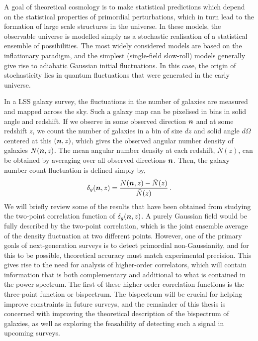 A goal of theoretical cosmology is to make statistical predictions which depend on the statistical properties of primordial perturbations, which in turn lead to the formation of large scale structures in the universe. In these models, the observable universe is modelled simply as a stochastic realisation of a statistical ensemble of possibilities. The most widely considered models are based on the inflationary paradigm, and the simplest (single-field slow-roll) models generally give rise to adiabatic Gaussian initial fluctuations. In this case, the origin of stochasticity lies in quantum fluctuations that were generated in the early universe. 

In a LSS galaxy survey, the fluctuations in the number of galaxies are measured and mapped across the sky. Such a galaxy map can be pixelised in bins in solid angle and redshift. If we observe in some observed direction $\bm {n}$ and at some redshift $z$, we count the number of galaxies in a bin of size $dz$ and solid angle $d\Omega$ centered at this $(\bm {n},z)$, which gives the observed angular number density of galaxies $N(\bm {n},z)$. The mean angular number density at each redshift, $\bar{N}(z)$, can be obtained by averaging over all observed directions $\bm {n}$. 
 Then, the galaxy number count fluctuation is defined simply by, 
\begin{equation}
	\delta_g(\bm {n},z) = \frac{N(\bm {n},z) - \bar{N}(z)}{\bar{N}(z)}\,.
\end{equation}
We will briefly review some of the results that have been obtained from studying the two-point correlation function of $\delta_g(\bm {n},z)$. A purely Gaussian field would be fully described by the two-point correlation, which is the joint ensemble average of the density fluctuation at two different points. However, one of the primary goals of next-generation surveys is to detect primordial non-Gaussianity, and for this to be possible, theoretical accuracy must match experimental precision. This gives rise to the need for analysis of higher-order correlators, which will contain information that is both complementary and additional to what is contained in the power spectrum. The first of these higher-order correlation functions is the three-point function or bispectrum. The bispectrum will be crucial for helping improve constraints in future surveys, and the remainder of this thesis is concerned with improving the theoretical description of the bispectrum of galaxies, as well as exploring the feasability of detecting such a signal in upcoming surveys.

